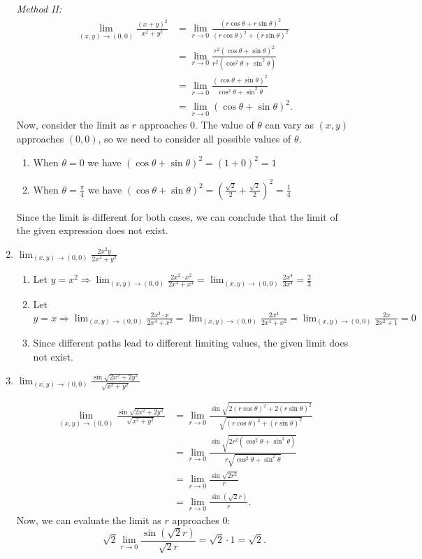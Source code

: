 \documentclass[letter,11pt]{article}
\begin{document}
\begin{enumerate}[label = \Alph*.]
    \vspace{0.5cm}
    \textit{Method II:}
        \begin{align*}
            \lim_{(x,y)\to (0,0)} \frac{(x+y)^2}{x^2+y^2} &= \lim_{r\to 0} \frac{(r\cos\theta + r\sin\theta)^2}{(r\cos\theta)^2 + (r\sin\theta)^2} \\
            &= \lim_{r\to 0} \frac{r^2(\cos\theta + \sin\theta)^2}{r^2(\cos^2\theta + \sin^2\theta)} \\
            &= \lim_{r\to 0} \frac{(\cos\theta + \sin\theta)^2}{\cos^2\theta + \sin^2\theta} \\
            &= \lim_{r\to 0} (\cos\theta + \sin\theta)^2.
        \end{align*}
    Now, consider the limit as $r$ approaches $0$. The value of $\theta$ can vary as $(x,y)$ approaches $(0,0)$, so we need to consider all possible values of $\theta$.
    \begin{enumerate}
        \item When $\theta = 0$ we have $(\cos\theta + \sin\theta)^2 = (1+0)^2=1$
        \item When $\theta = \frac{\pi}{4}$ we have $(\cos\theta + \sin\theta)^2 = (\frac{\sqrt{2}}{2}+\frac{\sqrt{2}}{2})^2=\frac{1}{4}$
    \end{enumerate}
    Since the limit is different for both cases, we can conclude that the limit of the given expression does not exist.
    \newpage
    \item $\lim_{(x,y)\to (0,0)} \frac{2x^2y}{2x^4+y^2}$
        \begin{enumerate}
            \item Let $y=x^2 \Longrightarrow \lim_{(x,y)\to (0,0)} \frac{2x^2 \cdot x^2}{2x^4+x^4} = \lim_{(x,y)\to (0,0)} \frac{2x^4}{3x^4}= \frac{2}{3}$
            \item Let $y=x \Longrightarrow \lim_{(x,y)\to (0,0)} \frac{2x^2 \cdot x}{2x^4+x^2} = \lim_{(x,y)\to (0,0)} \frac{2x^4}{2x^4+x^2}=\lim_{(x,y)\to (0,0)} \frac{2x}{2x^2+1} = 0$
            \item Since different paths lead to different limiting values, the given limit does not exist.
        \end{enumerate}
    \item $\lim_{(x,y)\to (0,0)} \frac{\sin \sqrt{2x^2+2y^2}}{\sqrt{x^2+y^2}}$

        \begin{align*}
\lim_{(x,y)\to (0,0)} \frac{\sin \sqrt{2x^2+2y^2}}{\sqrt{x^2+y^2}} &= \lim_{r\to 0} \frac{\sin \sqrt{2(r\cos\theta)^2+2(r\sin\theta)^2}}{\sqrt{(r\cos\theta)^2+(r\sin\theta)^2}} \\
&= \lim_{r\to 0} \frac{\sin \sqrt{2r^2(\cos^2\theta + \sin^2\theta)}}{r\sqrt{\cos^2\theta + \sin^2\theta}} \\
&= \lim_{r\to 0} \frac{\sin \sqrt{2r^2}}{r} \\
&= \lim_{r\to 0} \frac{\sin (\sqrt{2}r)}{r}.
\end{align*}
Now, we can evaluate the limit as $r$ approaches 0:
$$\sqrt{2} \lim_{r\to 0} \frac{\sin (\sqrt{2}r)}{\sqrt{2}r} = \sqrt{2} \cdot 1 = \sqrt{2}.$$
\end{enumerate}
\end{document}

